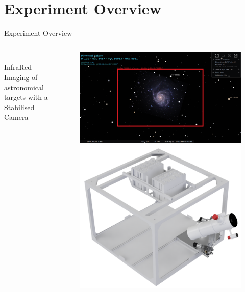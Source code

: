 \documentclass[11pt, aspectratio=169]{beamer}
\begin{document}
\section{Experiment Overview}
\begin{frame}[c]{Experiment Overview}
    \begin{columns}[t]
        \begin{column}{.4\textwidth}
            \centering
            \vspace{2cm}\\
            \large{InfraRed Imaging of astronomical targets with a Stabilised Camera}
        \end{column}
        \begin{column}{.6\textwidth}
        \vspace{-.5cm}
            \begin{figure}
                \includegraphics[height=.45\textheight]{overview/Pinwheel_BKP130.png}
                \includegraphics[height=.5\textheight]{overview/experiment_overview.png}
            \end{figure}
        \end{column}
    \end{columns}
\end{frame}
\end{document}
